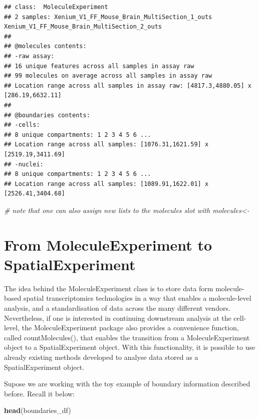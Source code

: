 \documentclass[
]{article}
\newenvironment{Shaded}{\begin{snugshade}}{\end{snugshade}}
\newcommand{\CommentTok}[1]{\textcolor[rgb]{0.56,0.35,0.01}{\textit{#1}}}
\newcommand{\KeywordTok}[1]{\textcolor[rgb]{0.13,0.29,0.53}{\textbf{#1}}}
\newcommand{\NormalTok}[1]{#1}
\begin{document}
\begin{verbatim}
## class:  MoleculeExperiment 
## 2 samples: Xenium_V1_FF_Mouse_Brain_MultiSection_1_outs Xenium_V1_FF_Mouse_Brain_MultiSection_2_outs 
## 
## @molecules contents: 
## -raw assay:
## 16 unique features across all samples in assay raw
## 99 molecules on average across all samples in assay raw
## Location range across all samples in assay raw: [4817.3,4880.05] x [286.19,6632.11]
## 
## @boundaries contents:
## -cells:
## 8 unique compartments: 1 2 3 4 5 6 ...
## Location range across all samples: [1076.31,1621.59] x [2519.19,3411.69]
## -nuclei:
## 8 unique compartments: 1 2 3 4 5 6 ...
## Location range across all samples: [1089.91,1622.01] x [2526.41,3404.68]
\end{verbatim}

\begin{Shaded}
\begin{Highlighting}[]
\CommentTok{\# note that one can also assign new lists to the molecules slot with molecules\textless{}{-}}
\end{Highlighting}
\end{Shaded}

\hypertarget{from-moleculeexperiment-to-spatialexperiment}{%
\section{From MoleculeExperiment to
SpatialExperiment}\label{from-moleculeexperiment-to-spatialexperiment}}

The idea behind the MoleculeExperiment class is to store data form
molecule-based spatial transcriptomics technologies in a way that
enables a molecule-level analysis, and a standardisation of data across
the many different vendors. Nevertheless, if one is interested in
continuing downstream analysis at the cell-level, the MoleculeExperiment
package also provides a convenience function, called countMolecules(),
that enables the transition from a MoleculeExperiment object to a
SpatialExperiment object. With this functionality, it is possible to use
already existing methods developed to analyse data stored as a
SpatialExperiment object.

Supose we are working with the toy example of boundary information
described before. Recall it below:

\begin{Shaded}
\begin{Highlighting}[]
\KeywordTok{head}\NormalTok{(boundaries\_df)}
\end{Highlighting}
\end{Shaded}
\end{document}
